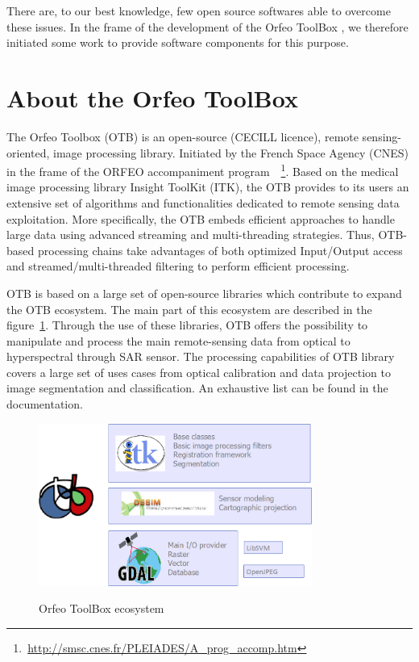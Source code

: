 \documentclass{josis}
\newcommand{\furl}[1]{    $\,$\footnote{$\,$\url{#1}}}
\begin{document}
There are, to our best knowledge, few open source softwares able to
overcome these issues. In the frame of the development of the Orfeo
ToolBox \cite{}, we therefore initiated some work to provide software
components for this purpose.

\section{About the Orfeo ToolBox}

The Orfeo Toolbox (OTB) is an open-source (CECILL licence), remote sensing-oriented, image processing library. Initiated by the French Space Agency (CNES) in the frame of the ORFEO accompaniment program~\furl{http://smsc.cnes.fr/PLEIADES/A_prog_accomp.htm}. Based on the medical image processing library Insight ToolKit (ITK), the OTB provides to its users an extensive set of algorithms and functionalities dedicated to remote sensing data exploitation. More specifically, the OTB embeds efficient approaches to handle large data using advanced streaming and multi-threading strategies. Thus, OTB-based processing chains take advantages of both optimized Input/Output access and streamed/multi-threaded filtering to perform efficient processing.

OTB is based on a large set of open-source libraries which contribute to expand the OTB ecosystem. The main part of this ecosystem are described in the figure~\ref{fig:ecosystem}. Through the use of these libraries, OTB offers the possibility to manipulate and process the main remote-sensing data from optical to hyperspectral through SAR sensor. The processing capabilities of OTB library covers a large set of uses cases from optical calibration and data projection to image segmentation and classification. An exhaustive list can be found in the documentation.   

\begin{figure}[!htb]
\centering
\includegraphics[width=0.8\textwidth]{Pictures/otb_ecosystem}\label{fig:ecosystem}
\caption{Orfeo ToolBox ecosystem}
\end{figure}
\end{document}
